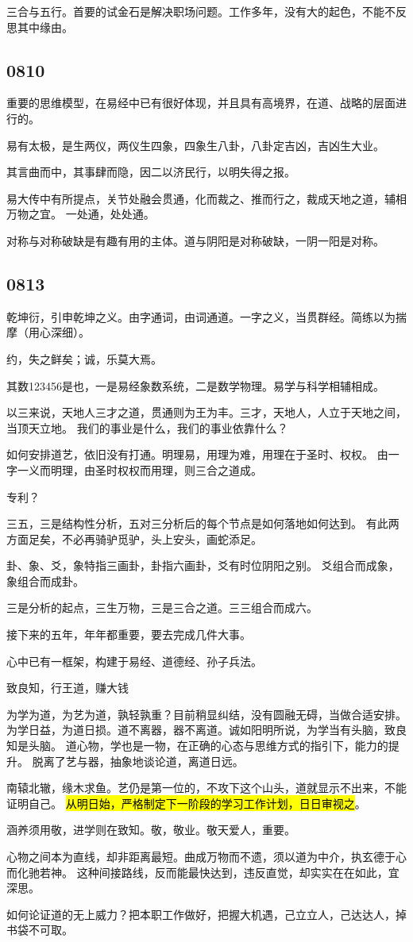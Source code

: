 三合与五行。首要的试金石是解决职场问题。工作多年，没有大的起色，不能不反思其中缘由。

\subsection{0810}

重要的思维模型，在易经中已有很好体现，并且具有高境界，在道、战略的层面进行的。

易有太极，是生两仪，两仪生四象，四象生八卦，八卦定吉凶，吉凶生大业。

其言曲而中，其事肆而隐，因二以济民行，以明失得之报。

易大传中有所提点，关节处融会贯通，化而裁之、推而行之，裁成天地之道，辅相万物之宜。
一处通，处处通。

对称与对称破缺是有趣有用的主体。道与阴阳是对称破缺，一阴一阳是对称。

\subsection{0813}

乾坤衍，引申乾坤之义。由字通词，由词通道。一字之义，当贯群经。简练以为揣摩（用心深细）。

约，失之鲜矣；诚，乐莫大焉。

其数123456是也，一是易经象数系统，二是数学物理。易学与科学相辅相成。

以三来说，天地人三才之道，贯通则为王为丰。三才，天地人，人立于天地之间，当顶天立地。
我们的事业是什么，我们的事业依靠什么？

如何安排道艺，依旧没有打通。明理易，用理为难，用理在于圣时、权权。
由一字一义而明理，由圣时权权而用理，则三合之道成。

专利？

三五，三是结构性分析，五对三分析后的每个节点是如何落地如何达到。
有此两方面足矣，不必再骑驴觅驴，头上安头，画蛇添足。

卦、象、爻，象特指三画卦，卦指六画卦，爻有时位阴阳之别。
爻组合而成象，象组合而成卦。

三是分析的起点，三生万物，三是三合之道。三三组合而成六。

接下来的五年，年年都重要，要去完成几件大事。

心中已有一框架，构建于易经、道德经、孙子兵法。

致良知，行王道，赚大钱

为学为道，为艺为道，孰轻孰重？目前稍显纠结，没有圆融无碍，当做合适安排。
为学日益，为道日损。道不离器，器不离道。诚如阳明所说，为学当有头脑，致良知是头脑。
道心物，学也是一物，在正确的心态与思维方式的指引下，能力的提升。
脱离了艺与器，抽象地谈论道，离道日远。

南辕北辙，缘木求鱼。艺仍是第一位的，不攻下这个山头，道就显示不出来，不能证明自己。
\hl{从明日始，严格制定下一阶段的学习工作计划，日日审视之}。

涵养须用敬，进学则在致知。敬，敬业。敬天爱人，重要。

心物之间本为直线，却非距离最短。曲成万物而不遗，须以道为中介，执玄德于心而化驰若神。
这种间接路线，反而能最快达到，违反直觉，却实实在在如此，宜深思。

如何论证道的无上威力？把本职工作做好，把握大机遇，己立立人，己达达人，掉书袋不可取。
